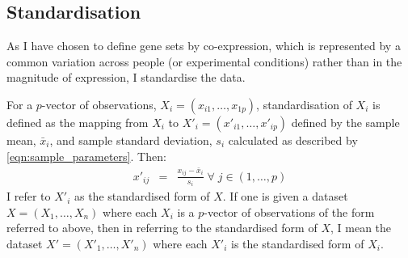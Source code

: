 \documentclass[12pt]{article} %
\begin{document}
	
	
	

	
	\subsection{Standardisation} \label{sec:standardisation}
	As I have chosen to define gene sets by co-expression, which is represented by a common variation across people (or experimental conditions) rather than in the magnitude of expression, I standardise the data.
	
	For a $p$-vector of observations, $X_i=(x_{i1},\ldots,x_{1p})$, standardisation of $X_i$ is defined as the mapping from $X_i$ to $X'_i=(x'_{i1},\ldots,x'_{ip})$ defined by the sample mean, $\bar{x}_i$, and sample standard deviation, $s_i$ calculated as described by \eqref{eqn:sample_parameters}. Then:
	\begin{eqnarray} \label{eqn:standardisation}
	x'_{ij} &=& \frac{x_{ij}- \bar{x}_i}{s_i} \; \forall \; j \in (1,\ldots,p)
	\end{eqnarray}
	I refer to $X'_i$ as the standardised form of $X$. If one is given a dataset $X=(X_1,\ldots,X_n)$ where each $X_i$ is a $p$-vector of observations of the form referred to above, then in referring to the standardised form of $X$, I mean the dataset $X'=(X'_1,\ldots,X'_n)$ where each $X'_i$ is the standardised form of $X_i$.
	
\end{document}
